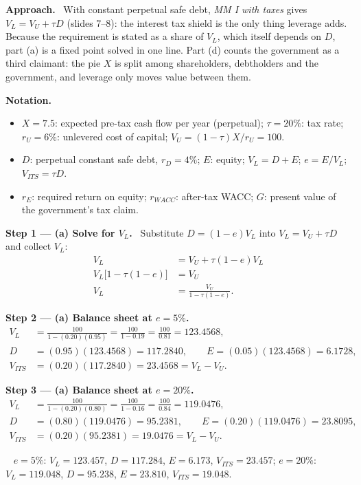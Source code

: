 \documentclass[11pt,a4paper]{article}
\numberwithin{equation}{section}
\newcommand{\notation}{\par\smallskip\noindent\textbf{Notation.}}
\newcommand{\step}[2]{\par\smallskip\noindent\textbf{Step #1 --- #2.}~}
\newcommand{\approach}{\par\smallskip\noindent\textbf{Approach.}~}
\newcommand{\answer}[1]{\par\smallskip\noindent\fbox{\textbf{Answer #1.}}~}
\begin{document}
\approach
With constant perpetual safe debt, \emph{MM I with taxes} gives $V_L=V_U+\tau D$ (slides 7--8): the
interest tax shield is the only thing leverage adds. Because the requirement is stated as a share of
$V_L$, which itself depends on $D$, part (a) is a fixed point solved in one line. Part (d) counts the
government as a third claimant: the pie $X$ is split among shareholders, debtholders and the
government, and leverage only moves value between them.

\notation
\begin{itemize}
  \item $X=7.5$: expected pre-tax cash flow per year (perpetual); $\tau=20\%$: tax rate; $r_U=6\%$: unlevered cost of capital; $V_U=(1-\tau)X/r_U=100$.
  \item $D$: perpetual constant safe debt, $r_D=4\%$; $E$: equity; $V_L=D+E$; $e=E/V_L$; $V_{ITS}=\tau D$.
  \item $r_E$: required return on equity; $r_{WACC}$: after-tax WACC; $G$: present value of the government's tax claim.
\end{itemize}

\step{1}{(a) Solve for $V_L$} Substitute $D=(1-e)V_L$ into $V_L=V_U+\tau D$ and collect $V_L$:
\begin{align}
  V_L &= V_U+\tau(1-e)V_L \nonumber\\
  V_L\bigl[1-\tau(1-e)\bigr] &= V_U \nonumber\\
  V_L &= \frac{V_U}{1-\tau(1-e)}. \label{eq:17VL}
\end{align}

\step{2}{(a) Balance sheet at $e=5\%$}
\begin{align}
  V_L &= \frac{100}{1-(0.20)(0.95)}=\frac{100}{1-0.19}=\frac{100}{0.81}=123.4568, \nonumber\\
  D &= (0.95)(123.4568)=117.2840,\qquad E=(0.05)(123.4568)=6.1728, \nonumber\\
  V_{ITS} &= (0.20)(117.2840)=23.4568=V_L-V_U. \nonumber
\end{align}

\step{3}{(a) Balance sheet at $e=20\%$}
\begin{align}
  V_L &= \frac{100}{1-(0.20)(0.80)}=\frac{100}{1-0.16}=\frac{100}{0.84}=119.0476, \nonumber\\
  D &= (0.80)(119.0476)=95.2381,\qquad E=(0.20)(119.0476)=23.8095, \nonumber\\
  V_{ITS} &= (0.20)(95.2381)=19.0476=V_L-V_U. \nonumber
\end{align}
\answer{(a)} $e=5\%$: $V_L=123.457$, $D=117.284$, $E=6.173$, $V_{ITS}=23.457$; $e=20\%$:
$V_L=119.048$, $D=95.238$, $E=23.810$, $V_{ITS}=19.048$.
\end{document}
